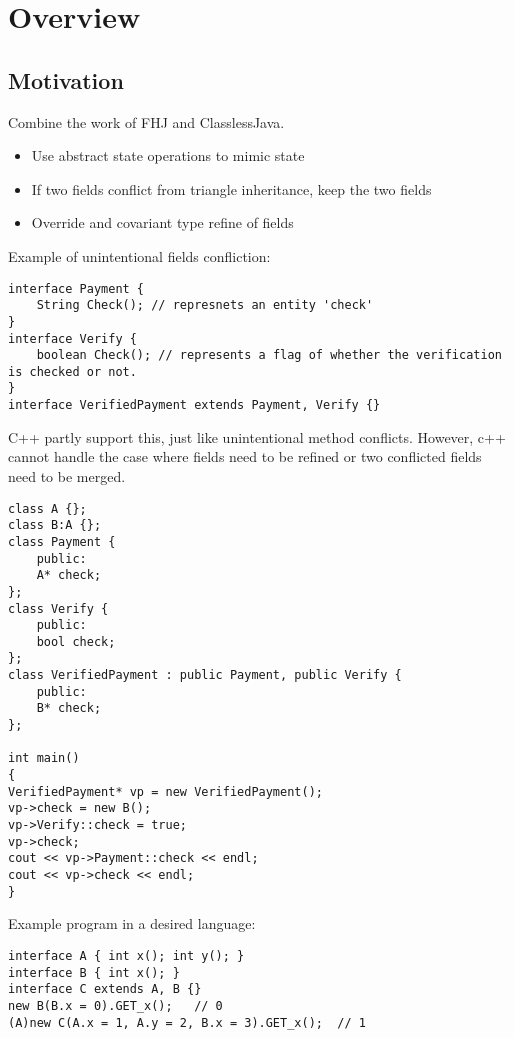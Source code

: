 \section{Overview}
\subsection{Motivation}
Combine the work of FHJ and ClasslessJava.
\begin{itemize}
	\item Use abstract state operations to mimic state
	\item If two fields conflict from triangle inheritance, keep the two fields
	\item Override and covariant type refine of fields
\end{itemize}

Example of unintentional fields confliction:
\begin{lstlisting}
interface Payment {
	String Check(); // represnets an entity 'check'
}
interface Verify {
	boolean Check(); // represents a flag of whether the verification is checked or not.
}
interface VerifiedPayment extends Payment, Verify {}
\end{lstlisting}

C++ partly support this, just like unintentional method conflicts. However, c++ cannot handle the case where fields need to be refined or two conflicted fields need to be merged.
\begin{lstlisting}
class A {};
class B:A {};
class Payment {
	public:
	A* check;
};
class Verify {
	public:
	bool check;
};
class VerifiedPayment : public Payment, public Verify {
	public:
	B* check;
};

int main()
{
VerifiedPayment* vp = new VerifiedPayment();
vp->check = new B();
vp->Verify::check = true;
vp->check;
cout << vp->Payment::check << endl;
cout << vp->check << endl;
}
\end{lstlisting}


Example program in a desired language:
\begin{lstlisting}
interface A { int x(); int y(); }
interface B { int x(); }
interface C extends A, B {}
new B(B.x = 0).GET_x();   // 0
(A)new C(A.x = 1, A.y = 2, B.x = 3).GET_x();  // 1
\end{lstlisting}

